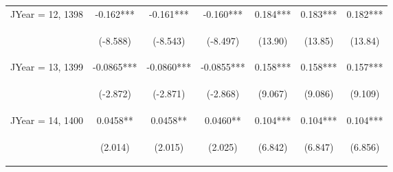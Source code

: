 \documentclass[]{article}
\begin{document}
\begin{center}
\begin{tabular}{lcccccc}
JYear = 12, 1398 & -0.162*** & -0.161*** & -0.160*** & 0.184*** & 0.183*** & 0.182*** \\
\vspace{4pt} & \begin{footnotesize}(-8.588)\end{footnotesize} & \begin{footnotesize}(-8.543)\end{footnotesize} & \begin{footnotesize}(-8.497)\end{footnotesize} & \begin{footnotesize}(13.90)\end{footnotesize} & \begin{footnotesize}(13.85)\end{footnotesize} & \begin{footnotesize}(13.84)\end{footnotesize} \\
JYear = 13, 1399 & -0.0865*** & -0.0860*** & -0.0855*** & 0.158*** & 0.158*** & 0.157*** \\
\vspace{4pt} & \begin{footnotesize}(-2.872)\end{footnotesize} & \begin{footnotesize}(-2.871)\end{footnotesize} & \begin{footnotesize}(-2.868)\end{footnotesize} & \begin{footnotesize}(9.067)\end{footnotesize} & \begin{footnotesize}(9.086)\end{footnotesize} & \begin{footnotesize}(9.109)\end{footnotesize} \\
JYear = 14, 1400 & 0.0458** & 0.0458** & 0.0460** & 0.104*** & 0.104*** & 0.104*** \\
\vspace{4pt} & \begin{footnotesize}(2.014)\end{footnotesize} & \begin{footnotesize}(2.015)\end{footnotesize} & \begin{footnotesize}(2.025)\end{footnotesize} & \begin{footnotesize}(6.842)\end{footnotesize} & \begin{footnotesize}(6.847)\end{footnotesize} & \begin{footnotesize}(6.856)\end{footnotesize} \\

\end{tabular}
\end{center}
\end{document}
